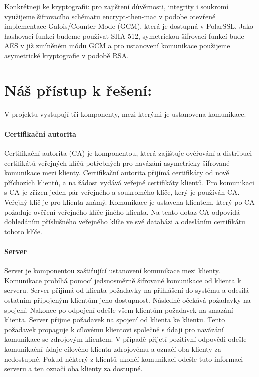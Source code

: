 \documentclass[a4paper, 12pt, titlepage]{article}
\begin{document}
Konkrétneji ke kryptografii: pro zajištení důvěrnosti, integrity i soukromí 
využijeme šifrovacího schématu encrypt-then-mac v podobe otevřené implementace 
Galois/Counter Mode (GCM),
která je dostupná v PolarSSL. Jako hashovaci funkci budeme používat SHA-512, 
symetrickou šifrovaci funkcí bude AES v již zmíněném módu GCM a pro ustanovení 
komunikace použijeme asymetrické
kryptografie v podobě RSA.

\section{Náš přístup k řešení:}

V projektu vystupují tři komponenty, mezi kterými je ustanovena komunikace.

\paragraph{Certifikační autorita}
Certifikační autorita (CA) je komponentou, která zajišťuje ověřování a 
distribuci certifikátů veřejných klíčů
potřebných pro navázání asymetricky šifrované komunikace mezi klienty. 
Certifikační autorita přijímá certifikáty od nově příchozích klientů, a na 
žádost vydává veřejné certifikáty klientů. Pro komunikaci s CA je zřízen jeden 
pár veřejného a  soukromého klíče, kerý je používán CA. Veřejný klíč je pro 
klienta známý. Komunikace je ustavena klientem, který po CA požaduje ověření 
veřejného klíče jiného klienta. Na tento dotaz CA odpovídá dohledáním 
příslušného veřejného klíče ve své databázi a odesláním certifikátu tohoto 
klíče.

\paragraph{Server}
Server je komponentou zaštiťující ustanovení komunikace mezi klienty. Komunikace 
probíhá pomocí jedsnosměrně šifrované komunikace od klienta k serveru. Server 
přijímá od klienta požadavky na přihlášení do systému a odesílá ostatním 
připojeným klientům jeho dostupnost. Následně očekává požadavky na spojení. 
Nakonec po odpojení odešle všem klientům požadavek na smazání klienta.
Server přijme požadavek na spojení od klienta ke klientu. Tento požadavek 
propaguje
k cílovému klientovi společně s údaji pro navázání komunikace se zdrojovým 
klientem. V případě přijetí pozitivní odpovědi odešle komunikační údaje cílového 
klienta zdrojovému a označí oba klienty za nedostupné. Pokud některý z klientů 
ukončí komunikaci odešle tuto informaci serveru a ten označí oba klienty za 
dostupné.
\end{document}
